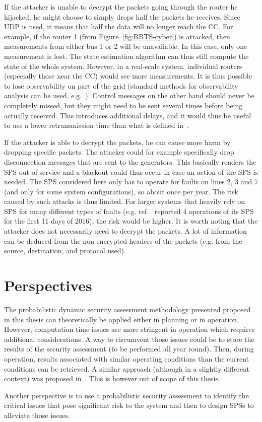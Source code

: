 If the attacker is unable to decrypt the packets going through the router he hijacked, he might choose to simply drops half the packets he receives. Since UDP is used, it means that half the data will no longer reach the CC. For example, if the router 1 (from Figure~\ref{fig:RBTS-cyber}) is attacked, then measurements from either bus 1 or 2 will be unavailable. In this case, only one measurement is lost. The state estimation algorithm can thus still compute the state of the whole system. However, in a real-scale system, individual routers (especially those near the CC) would see more measurements. It is thus possible to lose observability on part of the grid (standard methods for observability analysis can be used, e.g.~\cite{SEbook}). Control messages on the other hand should never be completely missed, but they might need to be sent several times before being actually received. This introduces additional delays, and it would thus be useful to use a lower retransmission time than what is defined in~\cite{roundTripTime}.

If the attacker is able to decrypt the packets, he can cause more harm by dropping specific packets. The attacker could for example specifically drop disconnection messages that are sent to the generators. This basically renders the SPS out of service and a blackout could thus occur in case an action of the SPS is needed. The SPS considered here only has to operate for faults on lines 2, 3 and 7 (and only for some system configurations), so about once per year. The risk caused by such attacks is thus limited. For larger systems that heavily rely on SPS for many different types of faults (e.g. ref.~\cite{GeorgiaSPS} reported 4 operations of its SPS for the first 11 days of 2016), the risk would be higher. It is worth noting that the attacker does not necessarily need to decrypt the packets. A lot of information can be deduced from the non-encrypted headers of the packets (e.g. from the source, destination, and protocol used).

\section{Perspectives}
\label{sec:SPSperspectives}

The probabilistic dynamic security assessment methodology presented proposed in this thesis can theoretically be applied either in planning or in operation. However, computation time issues are more stringent in operation which requires additional considerations. A way to circumvent those issues could be to store the results of the security assessment (to be performed all year round). Then, during operation, results associated with similar operating conditions than the current conditions can be retrieved. A similar approach (although in a slightly different context) was proposed in~\cite{QimingChenThesis}. This is however out of scope of this thesis.

Another perspective is to use a probabilistic security assessment to identify the critical issues that pose significant risk to the system and then to design SPSs to alleviate those issues.
